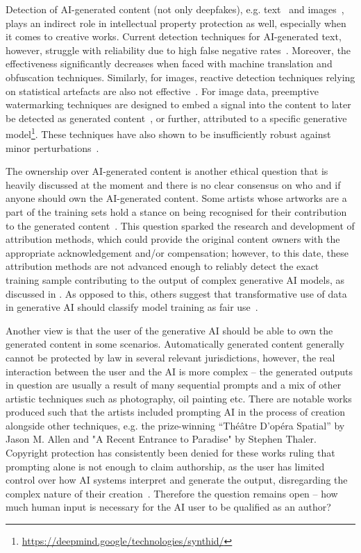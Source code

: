\documentclass[conference,table]{IEEEtran}
\begin{document}
Detection of AI-generated content (not only deepfakes), e.g. text~\cite{noauthor_science_2024} and images~\cite{liu_detecting_2022}, plays an indirect role in intellectual property protection as well, especially when it comes to creative works. 
Current detection techniques for AI-generated text, however, struggle with reliability due to high false negative rates~\cite{sadasivan_can_2024,weber-wulff_testing_2023}. 
Moreover, the effectiveness significantly decreases when faced with machine translation and obfuscation techniques.
Similarly, for images, reactive detection techniques relying on statistical artefacts are also not effective~\cite{corvi_detection_2023}.
For image data, preemptive watermarking techniques are designed to embed a signal into the content to later be detected as generated content~\cite{zhu_hidden_2018,zhang_udh_2020}, or further, attributed to a specific generative model\footnote{\url{https://deepmind.google/technologies/synthid/}}.
These techniques have also shown to be insufficiently robust against minor perturbations~\cite{jiang_evading_2023}.


The ownership over AI-generated content is another ethical question that is heavily discussed at the moment and there is no clear consensus on who and if anyone should own the AI-generated content. 
Some artists whose artworks are a part of the training sets hold a stance on being recognised for their contribution to the generated content~\cite{koziol_stable_2023}. 
This question sparked the research and development of attribution methods, which could provide the original content owners with the appropriate acknowledgement and/or compensation; however, to this date, these attribution methods are not advanced enough to reliably detect the exact training sample contributing to the output of complex generative AI models, as discussed in . 
As opposed to this, others suggest that transformative use of data in generative AI should classify model training as fair use~\cite{lemley_fair_2021}.   

Another view is that the user of the generative AI should be able to own the generated content in some scenarios. Automatically generated content generally cannot be protected by law in several relevant jurisdictions, however, the real interaction between the user and the AI is more complex -- the generated outputs in question are usually a result of many sequential prompts and a mix of other artistic techniques such as photography, oil painting etc. 
There are notable works produced such that the artists included prompting AI in the process of creation alongside other techniques, e.g. the prize-winning “Théâtre D’opéra Spatial” by Jason M. Allen and "A Recent Entrance to Paradise" by Stephen Thaler.
Copyright protection has consistently been denied for these works ruling that prompting alone is not enough to claim authorship, as the user has limited control over how AI systems interpret and generate the output, disregarding the complex nature of their creation~\cite{roose_ai-generated_2022,brodkin_us_2023}.
Therefore the question remains open -- how much human input is necessary for the AI user to be qualified as an author?
\end{document}
